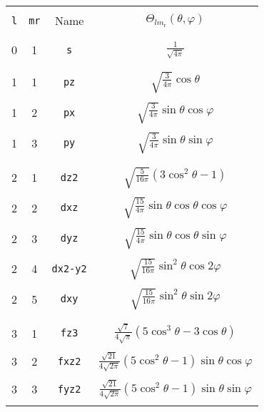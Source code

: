 \begin{table}
\begin{center}
\begin{tabular}{|cccc|}
\hline\hline
&&&\\
\verb#l# & \verb#mr# & Name & $\Theta_{lm_{\mathrm{r}}}(\theta,\varphi)$ \\ 
&&&\\\hline&&&\\
 0  &  1  &  \verb#s#   & $\frac{1}{\sqrt{4\pi}}$ \\ 
&&&\\\hline&&&\\
 1  &  1  &  \verb#pz#  & $\sqrt{\frac{3}{4\pi}}\cos\theta$ \\
&&&\\
 1  &  2  &  \verb#px#  & $\sqrt{\frac{3}{4\pi}}\sin\theta\cos\varphi$ \\
&&&\\
 1  &  3  &  \verb#py#  & $\sqrt{\frac{3}{4\pi}}\sin\theta\sin\varphi$ \\ 
&&&\\\hline&&&\\
 2  &  1  &  \verb#dz2# &
$\sqrt{\frac{5}{16\pi}}(3\cos^{2}\theta -1)$ \\
&&&\\
 2  &  2  &  \verb#dxz# &
$\sqrt{\frac{15}{4\pi}}\sin\theta\cos\theta\cos\varphi$ \\
&&&\\
 2  &  3  &  \verb#dyz# &
$\sqrt{\frac{15}{4\pi}}\sin\theta\cos\theta\sin\varphi$ \\
&&&\\
 2  &  4  &  \verb#dx2-y2# &
$\sqrt{\frac{15}{16\pi}}\sin^{2}\theta\cos2\varphi$ \\
&&&\\
 2  &  5  &  \verb#dxy# &
$\sqrt{\frac{15}{16\pi}}\sin^{2}\theta\sin2\varphi$ \\
&&&\\\hline&&&\\
 3  &  1  &  \verb#fz3# & 
$\frac{\sqrt{7}}{4\sqrt{\pi}}(5\cos^{3}\theta-3\cos\theta)$ \\
&&&\\
 3  &  2  &  \verb#fxz2# & 
$\frac{\sqrt{21}}{4\sqrt{2\pi}}(5\cos^{2}\theta-1)\sin\theta\cos\varphi$\\
&&&\\
 3  &  3  &  \verb#fyz2# & 
$\frac{\sqrt{21}}{4\sqrt{2\pi}}(5\cos^{2}\theta-1)\sin\theta\sin\varphi$\\
&&&\\

\end{tabular}
\end{center}
\end{table}
